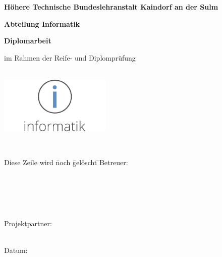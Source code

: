 \begin{titlepage}
	
	{\textbf {Höhere Technische Bundeslehranstalt Kaindorf an der Sulm}\par\vspace{0.3cm}}
	{\textbf {Abteilung Informatik}\par	\vspace{0.7cm}}
	\Large{\textbf{Diplomarbeit}}\par\vspace{0.2cm}
	\small im Rahmen der Reife- und Diplomprüfung\par
	\vspace{1.5cm}
	\Huge\textbf{\daTitle}\\
	\vspace{1cm}
	\includegraphics[width=0.4\textwidth]{images/inf_farbe_2.pdf}\\
	\vspace{1cm}
	\normalsize \daAuthorOne \par
	\normalsize \daAuthorTwo \par
	\normalsize \daAuthorThree \par
	\vspace{0,5cm}
	\daGrade\\ \daYear
	\vfill
	\begin{flushleft}
	\begin{tabbing}
	Diese Zeile wird \= noch \= gelöscht \=  \kill\vspace{0.2cm}Betreuer:\> \daSupervisorOne\par 
	\\\vspace{0.2cm}\> \daSupervisorTwo \par 
	\\\vspace{0.2cm}\> \daSupervisorThree \par 
	\\\vspace{0.2cm}Projektpartner:\> \daPartner \par
	\\Datum:\> \daDocDate
	\end{tabbing}
	\end{flushleft}
\end{titlepage}